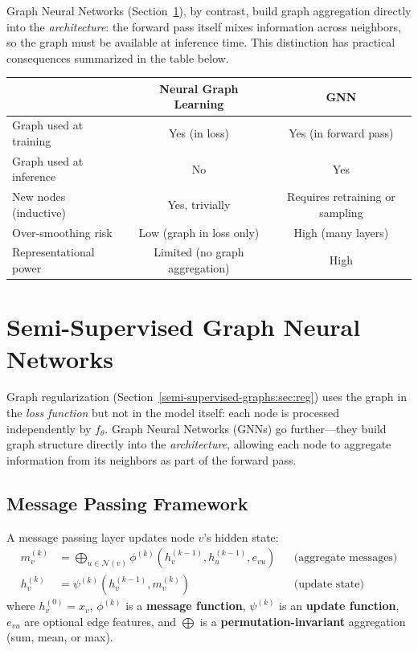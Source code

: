 \begin{notechapter}
\begin{warningbox}
Graph Neural Networks (Section~\ref{semi-supervised-graphs:sec:gnn}), by contrast, build graph
aggregation directly into the \emph{architecture}: the forward pass itself
mixes information across neighbors, so the graph must be available at inference
time. This distinction has practical consequences summarized in the table below.
\end{warningbox}

\begin{center}
\small
\begin{tabular}{lcc}
\toprule
& \textbf{Neural Graph Learning} & \textbf{GNN} \\
\midrule
Graph used at training    & Yes (in loss)         & Yes (in forward pass) \\
Graph used at inference   & No                    & Yes \\
New nodes (inductive)     & Yes, trivially        & Requires retraining or sampling \\
Over-smoothing risk       & Low (graph in loss only) & High (many layers) \\
Representational power    & Limited (no graph aggregation) & High \\
\bottomrule
\end{tabular}
\end{center}

\section{Semi-Supervised Graph Neural Networks}
\label{semi-supervised-graphs:sec:gnn}

Graph regularization (Section~\ref{semi-supervised-graphs:sec:reg}) uses the graph in the
\emph{loss function} but not in the model itself: each node is processed
independently by $f_\theta$. Graph Neural Networks (GNNs) go further---they
build graph structure directly into the \emph{architecture}, allowing each
node to aggregate information from its neighbors as part of the forward pass.

\subsection{Message Passing Framework}

\begin{definition}
\label{semi-supervised-graphs:def:mpnn}
A message passing layer updates node $v$'s hidden state:
\begin{align}
m_v^{(k)} &= \bigoplus_{u \in \mathcal{N}(v)}\phi^{(k)}(h_v^{(k-1)},
            h_u^{(k-1)}, e_{vu}) && \text{(aggregate messages)} \\
h_v^{(k)} &= \psi^{(k)}(h_v^{(k-1)}, m_v^{(k)}) && \text{(update state)}
\end{align}
where $h_v^{(0)} = x_v$, $\phi^{(k)}$ is a \textbf{message function},
$\psi^{(k)}$ is an \textbf{update function}, $e_{vu}$ are optional edge
features, and $\bigoplus$ is a \textbf{permutation-invariant} aggregation
(sum, mean, or max).
\end{definition}


\end{notechapter}
